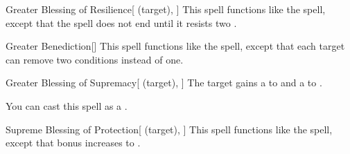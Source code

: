 \lowercase{\hypertarget{spell:Greater Blessing of Resilience}{}}\label{spell:Greater Blessing of Resilience}
\begin{attuneability}[Rank 7]{\hypertarget{spell:Greater Blessing of Resilience}{Greater Blessing of Resilience}}[ (target), ]
This spell functions like the  spell, except that the spell does not end until it resists two .
\end{attuneability}
\vspace{0.25em}



\lowercase{\hypertarget{spell:Greater Benediction}{}}\label{spell:Greater Benediction}
\begin{freeability}[Rank 8]{\hypertarget{spell:Greater Benediction}{Greater Benediction}}[]
This spell functions like the  spell, except that each target can remove two conditions instead of one.
\end{freeability}
\vspace{0.25em}



\lowercase{\hypertarget{spell:Greater Blessing of Supremacy}{}}\label{spell:Greater Blessing of Supremacy}
\begin{attuneability}[Rank 8]{\hypertarget{spell:Greater Blessing of Supremacy}{Greater Blessing of Supremacy}}[ (target), ]
The target gains a   to  and a   to .

You can cast this spell as a .
\end{attuneability}
\vspace{0.25em}



\lowercase{\hypertarget{spell:Supreme Blessing of Protection}{}}\label{spell:Supreme Blessing of Protection}
\begin{attuneability}[Rank 8]{\hypertarget{spell:Supreme Blessing of Protection}{Supreme Blessing of Protection}}[ (target), ]
This spell functions like the  spell, except that bonus increases to .
\end{attuneability}
\vspace{0.25em}



